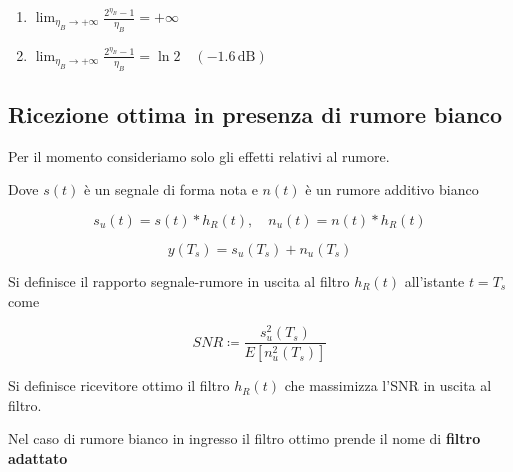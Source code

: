 \documentclass{article}
\begin{document}
\begin{enumerate}
  \item 
  $\lim_{\eta_B \to +\infty} \frac{2^{\eta_B } - 1}{\eta_B } = +\infty$
  

  \item $\lim_{\eta_B \to +\infty} \frac{2^{\eta_B } - 1}{\eta_B } = \ln{2} \quad (-1.6 \, \text{dB})$
  
\end{enumerate}


\subsection*{Ricezione ottima in presenza di rumore bianco}

Per il momento consideriamo solo gli effetti relativi al rumore.

\begin{center}
\end{center}
Dove \( s(t) \) è un segnale di forma nota e \( n(t) \) è un rumore additivo bianco

\[
s_u(t) = s(t) \ast h_R(t), \quad n_u(t) = n(t) \ast h_R(t)
\]

\[
y(T_s) = s_u(T_s) + n_u(T_s)
\]

Si definisce il rapporto segnale-rumore in uscita al filtro \( h_R(t) \) all'istante \( t = T_s \) come

\[
SNR \coloneqq \frac{s_u^2(T_s)}{E[n_u^2(T_s)]}
\]

Si definisce ricevitore ottimo il filtro \( h_R(t) \) che massimizza l'SNR in uscita al filtro.

Nel caso di rumore bianco in ingresso il filtro ottimo prende il nome di \textbf{filtro adattato}
\end{document}
